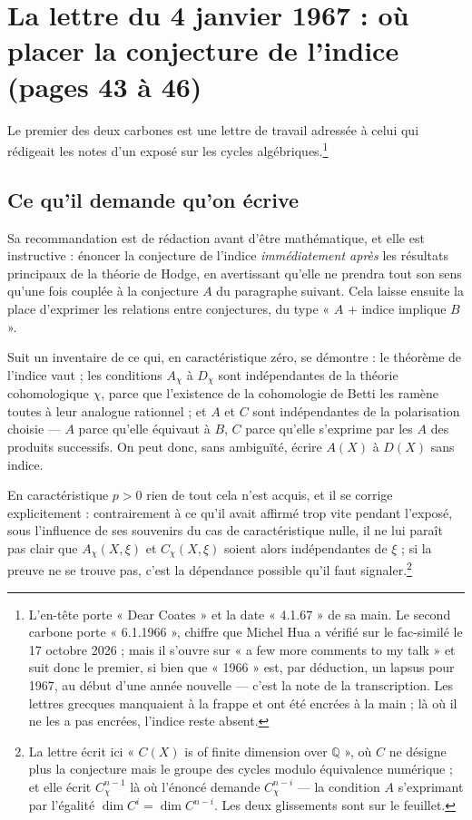 \documentclass[11pt,a4paper]{article}
\begin{document}
\section*{La lettre du 4 janvier 1967 : où placer la conjecture de l'indice (pages 43 à 46)}

Le premier des deux carbones est une lettre de travail adressée à celui qui
rédigeait les notes d'un exposé sur les cycles algébriques.\footnote{L'en-tête
porte « Dear Coates » et la date « 4.1.67 » de sa main. Le second carbone porte
« 6.1.1966 », chiffre que Michel Hua a vérifié sur le fac-similé le 17 octobre 2026 ; mais il s'ouvre sur « a few more comments to my talk » et suit
donc le premier, si bien que « 1966 » est, par déduction, un lapsus pour 1967,
au début d'une année nouvelle --- c'est la note de la transcription. Les lettres grecques manquaient à la frappe et ont
été encrées à la main ; là où il ne les a pas encrées, l'indice reste absent.}

\subsection*{Ce qu'il demande qu'on écrive}

Sa recommandation est de rédaction avant d'être mathématique, et elle est
instructive : énoncer la conjecture de l'indice \emph{immédiatement après} les
résultats principaux de la théorie de Hodge, en avertissant qu'elle ne prendra
tout son sens qu'une fois couplée à la conjecture $A$ du paragraphe suivant.
Cela laisse ensuite la place d'exprimer les relations entre conjectures, du
type « $A$ + indice implique $B$ ».

Suit un inventaire de ce qui, en caractéristique zéro, se démontre : le
théorème de l'indice vaut ; les conditions $A_{\chi}$ à $D_{\chi}$ sont
indépendantes de la théorie cohomologique $\chi$, parce que l'existence de la
cohomologie de Betti les ramène toutes à leur analogue rationnel ; et $A$ et
$C$ sont indépendantes de la polarisation choisie --- $A$ parce qu'elle
équivaut à $B$, $C$ parce qu'elle s'exprime par les $A$ des produits successifs.
On peut donc, sans ambiguïté, écrire $A(X)$ à $D(X)$ sans indice.

En caractéristique $p > 0$ rien de tout cela n'est acquis, et il se corrige
explicitement : contrairement à ce qu'il avait affirmé trop vite pendant
l'exposé, sous l'influence de ses souvenirs du cas de caractéristique nulle, il
ne lui paraît pas clair que $A_{\chi}(X,\xi)$ et $C_{\chi}(X,\xi)$ soient alors
indépendantes de $\xi$ ; si la preuve ne se trouve pas, c'est la dépendance
possible qu'il faut signaler.\footnote{La lettre écrit ici « $C(X)$ is of
finite dimension over $\mathbb{Q}$ », où $C$ ne désigne plus la conjecture mais
le groupe des cycles modulo équivalence numérique ; et elle écrit
$C^{n-1}_{\chi}$ là où l'énoncé demande $C^{n-i}_{\chi}$ --- la condition $A$
s'exprimant par l'égalité $\dim C^{i} = \dim C^{n-i}$. Les deux glissements
sont sur le feuillet.}
\end{document}
